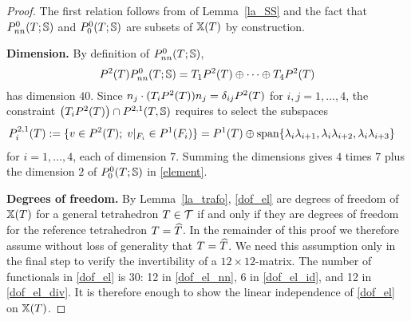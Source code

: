 \documentclass[11pt]{article}
\begin{document}
\begin{proof}
The first relation follows from of Lemma~\ref{la_SS} and
the fact that $P^0_{nn}(T;\mathbb{S})$ and $P^0_0(T;\mathbb{S})$ are subsets of $\mathbb{X}(T)$ by construction.

{\bf Dimension.}
By definition of $P^0_{nn}(T;\mathbb{S})$,
\[
   P^2(T) P^0_{nn}(T;\mathbb{S}) = T_1P^2(T)\oplus \cdots \oplus T_4P^2(T)
\]
has dimension $40$.
Since $n_j\cdot(T_iP^2(T)) n_j=\delta_{ij}P^2(T)$ for $i,j=1,\ldots,4$,
the constraint
$\bigl(T_iP^2(T)\bigr)\cap P^{2,1}(T,\mathbb{S})$ requires to select the subspaces
\begin{align*}
   P^{2,1}_i(T)
   &:=\{v\in P^2(T);\; v|_{F_i}\in P^1(F_i)\} 
   = P^1(T)\oplus
   \mathrm{span}\{\lambda_i\lambda_{i+1},\lambda_i\lambda_{i+2},\lambda_i\lambda_{i+3}\}
\end{align*}
for $i=1,\ldots,4$, each of dimension $7$. Summing the dimensions gives $4$ times $7$
plus the dimension $2$ of $P^0_0(T;\mathbb{S})$ in \eqref{element}.

{\bf Degrees of freedom.}
By Lemma~\ref{la_trafo}, \eqref{dof_el} are degrees of freedom of $\mathbb{X}(T)$
for a general tetrahedron $T\in\mathcal{T}$ if and only if they are degrees of freedom
for the reference tetrahedron $T={\widehat T}$.
In the remainder of this proof we therefore assume without loss of generality
that $T={\widehat T}$. We need this assumption only in the final step
to verify the invertibility of a $12\times 12$-matrix.
The number of functionals in \eqref{dof_el} is
$30$: 12 in \eqref{dof_el_nn}, 6 in \eqref{dof_el_id}, and 12 in \eqref{dof_el_div}.
It is therefore enough to show the linear independence of \eqref{dof_el} on $\mathbb{X}(T)$.


\end{proof}
\end{document}
